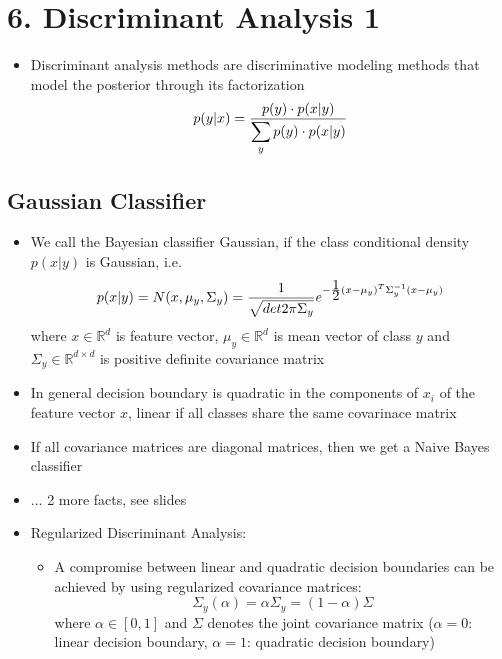 \section*{6. Discriminant Analysis 1}
\begin{itemize}
    \item
        Discriminant analysis methods are discriminative modeling methods that model the posterior through its factorization
    $$ p(y|x) = \frac{\displaystyle p(y) \cdot p(x|y)}{\displaystyle \sum_y p(y) \cdot p(x|y)} $$
\end{itemize}

\subsection*{Gaussian Classifier}
\begin{itemize}
    \item
        We call the Bayesian classifier Gaussian, if the class conditional density $p(x|y)$ is Gaussian, i.e.
        $$p(x|y) = N(x, \mu_y, \Sigma_y) = \frac{\displaystyle 1}{\displaystyle \sqrt{det 2 \pi \Sigma_y}} e^{-\frac{\displaystyle 1}{\displaystyle 2} (x-\mu_y)^T \Sigma_y^{-1} (x-\mu_y)} $$
        where
        $x \in \mathbb{R}^d$ is feature vector, $\mu_y \in \mathbb{R}^d$ is mean vector of class $y$ and $\Sigma_y \in \mathbb{R}^{d \times d}$ is positive definite covariance matrix
    \item
        In general decision boundary is quadratic in the components of $x_i$ of the feature vector $x$, linear if all classes share the same covarinace matrix
    \item
        If all covariance matrices are diagonal matrices, then we get a Naive Bayes classifier
    \item
        ... 2 more facts, see slides
    \item
        Regularized Discriminant Analysis:
        \begin{itemize}
            \item
                A compromise between linear and quadratic decision boundaries can be achieved by using regularized covariance matrices:
                $$\Sigma_y (\alpha) = \alpha \Sigma_y = (1 - \alpha) \Sigma$$
                where $\alpha \in [0,1]$ and $\Sigma$ denotes the joint covariance matrix ($\alpha = 0$: linear decision boundary, $\alpha = 1$: quadratic decision boundary)
        \end{itemize}

\end{itemize}
